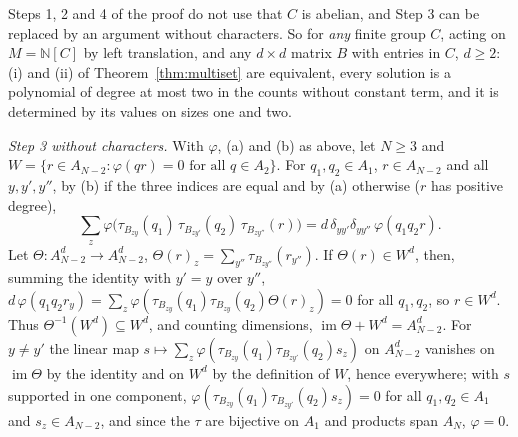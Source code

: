 \begin{remark}\label{rem:multisetna}
Steps 1, 2 and 4 of the proof do not use that $C$ is abelian, and Step 3 can be replaced by an argument without characters. So for \emph{any} finite group $C$, acting on $M=\mathbb{N}[C]$ by left translation, and any $d\times d$ matrix $B$ with entries in $C$, $d\ge2$: (i) and (ii) of Theorem~\ref{thm:multiset} are equivalent, every solution is a polynomial of degree at most two in the counts without constant term, and it is determined by its values on sizes one and two.

\emph{Step 3 without characters.} With $\varphi$, (a) and (b) as above, let $N\ge3$ and $W=\{r\in A_{N-2}:\varphi(qr)=0\text{ for all }q\in A_2\}$. For $q_1,q_2\in A_1$, $r\in A_{N-2}$ and all $y,y',y''$, by (b) if the three indices are equal and by (a) otherwise ($r$ has positive degree),
\[
\sum_z\varphi\bigl(\tau_{B_{zy}}(q_1)\,\tau_{B_{zy'}}(q_2)\,\tau_{B_{zy''}}(r)\bigr)=d\,\delta_{yy'}\delta_{yy''}\,\varphi(q_1q_2r).
\]
Let $\Theta\colon A_{N-2}^d\to A_{N-2}^d$, $\Theta(r)_z=\sum_{y''}\tau_{B_{zy''}}(r_{y''})$. If $\Theta(r)\in W^d$, then, summing the identity with $y'=y$ over $y''$, $d\,\varphi(q_1q_2r_y)=\sum_z\varphi(\tau_{B_{zy}}(q_1)\tau_{B_{zy}}(q_2)\Theta(r)_z)=0$ for all $q_1,q_2$, so $r\in W^d$. Thus $\Theta^{-1}(W^d)\subseteq W^d$, and counting dimensions, $\operatorname{im}\Theta+W^d=A_{N-2}^d$. For $y\ne y'$ the linear map $s\mapsto\sum_z\varphi(\tau_{B_{zy}}(q_1)\tau_{B_{zy'}}(q_2)s_z)$ on $A_{N-2}^d$ vanishes on $\operatorname{im}\Theta$ by the identity and on $W^d$ by the definition of $W$, hence everywhere; with $s$ supported in one component, $\varphi(\tau_{B_{zy}}(q_1)\tau_{B_{zy'}}(q_2)s_z)=0$ for all $q_1,q_2\in A_1$ and $s_z\in A_{N-2}$, and since the $\tau$ are bijective on $A_1$ and products span $A_N$, $\varphi=0$.


\end{remark}

